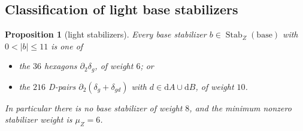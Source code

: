 \documentclass[11pt]{article}
\newcommand{\wt}[1]{\lvert #1\rvert}
\DeclareMathOperator{\Stab}{Stab}
\theoremstyle{plain}
\newtheorem{proposition}[lemma]{Proposition}
\theoremstyle{definition}
\theoremstyle{remark}
\begin{document}
\subsection{Classification of light base stabilizers}\label{subsec:classification}

\begin{proposition}[light stabilizers]\label{prop:lightstab}
Every base stabilizer $b\in\Stab_Z(\mathrm{base})$ with $0<\wt b\le 11$ is one of
\begin{itemize}
\item the $36$ \emph{hexagons} $\partial_2\delta_g$, of weight $6$; or
\item the $216$ \emph{D-pairs} $\partial_2(\delta_g+\delta_{gd})$ with $d\in
  \mathrm dA\cup\mathrm dB$, of weight $10$.
\end{itemize}
In particular there is no base stabilizer of weight $8$, and the minimum nonzero
stabilizer weight is $\mu_Z=6$.
\end{proposition}
\end{document}
